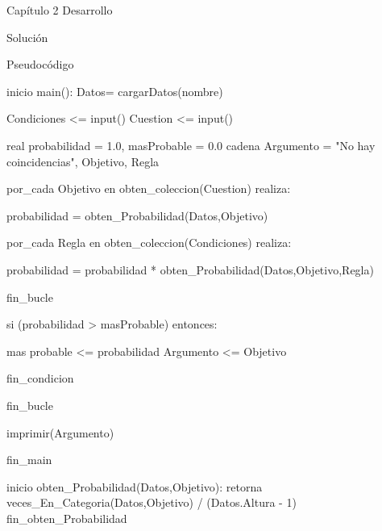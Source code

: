 \documentclass[
  spanish,
  ignorenonframetext,
]{beamer}
\newenvironment{Shaded}{}{}
\newcommand{\BuiltInTok}[1]{#1}
\newcommand{\DecValTok}[1]{\textcolor[rgb]{0.25,0.63,0.44}{#1}}
\newcommand{\FloatTok}[1]{\textcolor[rgb]{0.25,0.63,0.44}{#1}}
\newcommand{\NormalTok}[1]{#1}
\newcommand{\OperatorTok}[1]{\textcolor[rgb]{0.40,0.40,0.40}{#1}}
\newcommand{\StringTok}[1]{\textcolor[rgb]{0.25,0.44,0.63}{#1}}
\begin{document}
\begin{frame}{Capítulo 2 Desarrollo}
\protect\hypertarget{capuxedtulo-2-desarrollo}{}
\begin{block}{Solución}
\protect\hypertarget{soluciuxf3n}{}
\begin{block}{Pseudocódigo}
\protect\hypertarget{pseudocuxf3digo}{}
\begin{Shaded}
\begin{Highlighting}[]
\NormalTok{inicio main():}
\NormalTok{    Datos}\OperatorTok{=}\NormalTok{ cargarDatos(nombre)}

\NormalTok{    Condiciones }\OperatorTok{\textless{}=} \BuiltInTok{input}\NormalTok{()}
\NormalTok{    Cuestion    }\OperatorTok{\textless{}=} \BuiltInTok{input}\NormalTok{()}

\NormalTok{    real    probabilidad }\OperatorTok{=} \FloatTok{1.0}\NormalTok{, masProbable }\OperatorTok{=} \FloatTok{0.0}
\NormalTok{    cadena  Argumento }\OperatorTok{=} \StringTok{"No hay coincidencias"}\NormalTok{, Objetivo, Regla }

\NormalTok{    por\_cada Objetivo en obten\_coleccion(Cuestion) realiza:}

\NormalTok{        probabilidad }\OperatorTok{=}\NormalTok{ obten\_Probabilidad(Datos,Objetivo)}

\NormalTok{        por\_cada Regla en obten\_coleccion(Condiciones) realiza:}

\NormalTok{            probabilidad }\OperatorTok{=}\NormalTok{ probabilidad }\OperatorTok{*}\NormalTok{ obten\_Probabilidad(Datos,Objetivo,Regla)}

\NormalTok{        fin\_bucle}

\NormalTok{        si (probabilidad }\OperatorTok{\textgreater{}}\NormalTok{ masProbable) entonces:}

\NormalTok{            mas probable }\OperatorTok{\textless{}=}\NormalTok{ probabilidad}
\NormalTok{            Argumento    }\OperatorTok{\textless{}=}\NormalTok{ Objetivo}

\NormalTok{        fin\_condicion}

\NormalTok{    fin\_bucle}

\NormalTok{    imprimir(Argumento)}

\NormalTok{fin\_main}

\NormalTok{inicio obten\_Probabilidad(Datos,Objetivo):}
\NormalTok{    retorna veces\_En\_Categoria(Datos,Objetivo) }\OperatorTok{/}\NormalTok{ (Datos.Altura }\OperatorTok{{-}} \DecValTok{1}\NormalTok{)}
\NormalTok{fin\_obten\_Probabilidad}


\end{Highlighting}
\end{Shaded}
\end{block}
\end{block}
\end{frame}
\end{document}
